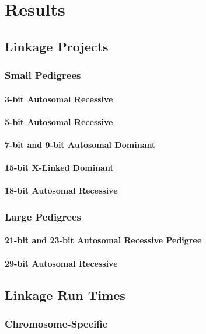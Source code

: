 \chapter{Results}

\section{Linkage Projects}

\subsection{Small Pedigrees}
\subsubsection{3-bit Autosomal Recessive}
\subsubsection{5-bit Autosomal Recessive}
\subsubsection{7-bit and 9-bit Autosomal Dominant}
\subsubsection{15-bit X-Linked Dominant}
\subsubsection{18-bit Autosomal Recessive}

\subsection{Large Pedigrees}
\subsubsection{21-bit and 23-bit Autosomal Recessive Pedigree}
\subsubsection{29-bit Autosomal Recessive}


\section{Linkage Run Times}
\subsection{Chromosome-Specific}
